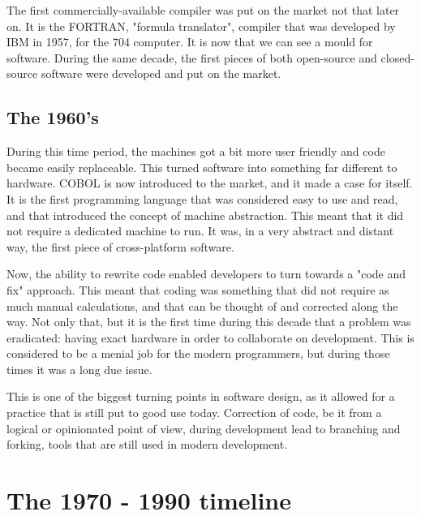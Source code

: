 \par
The first commercially-available compiler was put on the market not that later on.
It is the FORTRAN, "formula translator"\cite{a0compiler}, compiler that was developed by IBM in 1957, for the 704 computer.
It is now that we can see a mould for software.
During the same decade, the first pieces of both open-source and closed-source software were developed and put on the market.

\subsection{The 1960's}
During this time period, the machines got a bit more user friendly and code became easily replaceable.
This turned software into something far different to hardware.
COBOL is now introduced to the market, and it made a case for itself.
It is the first programming language that was considered easy to use and read, and that introduced the concept of machine abstraction.
This meant that it did not require a dedicated machine to run.
It was, in a very abstract and distant way, the first piece of cross-platform software.

\par
Now, the ability to rewrite code enabled developers to turn towards a "code and fix" approach\cite{boehmb06}.
This meant that coding was something that did not require as much manual calculations, and that can be thought of and corrected along the way.
Not only that, but it is the first time during this decade that a problem was eradicated: having exact hardware in order to collaborate on development.
This is considered to be a menial job for the modern programmers, but during those times it was a long due issue.

\par
This is one of the biggest turning points in software design, as it allowed for a practice that is still put to good use today.
Correction of code, be it from a logical or opinionated point of view, during development lead to branching and forking, tools that are still used in modern development.

\section{The 1970 - 1990 timeline}


